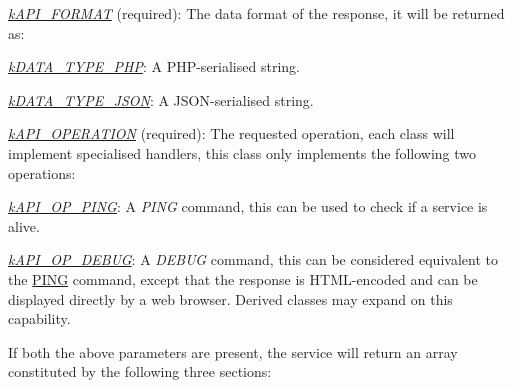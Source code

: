 \begin{DoxyItemize}
\item {\itshape \hyperlink{}{k\-A\-P\-I\-\_\-\-F\-O\-R\-M\-A\-T}\/} (required)\-: The data format of the response, it will be returned as\-: 
\begin{DoxyItemize}
\item {\itshape \hyperlink{}{k\-D\-A\-T\-A\-\_\-\-T\-Y\-P\-E\-\_\-\-P\-H\-P}\/}\-: A P\-H\-P-\/serialised string. 
\item {\itshape \hyperlink{}{k\-D\-A\-T\-A\-\_\-\-T\-Y\-P\-E\-\_\-\-J\-S\-O\-N}\/}\-: A J\-S\-O\-N-\/serialised string. 
\end{DoxyItemize}
\item {\itshape \hyperlink{}{k\-A\-P\-I\-\_\-\-O\-P\-E\-R\-A\-T\-I\-O\-N}\/} (required)\-: The requested operation, each class will implement specialised handlers, this class only implements the following two operations\-: 
\begin{DoxyItemize}
\item {\itshape \hyperlink{}{k\-A\-P\-I\-\_\-\-O\-P\-\_\-\-P\-I\-N\-G}\/}\-: A {\itshape P\-I\-N\-G\/} command, this can be used to check if a service is alive. 
\item {\itshape \hyperlink{}{k\-A\-P\-I\-\_\-\-O\-P\-\_\-\-D\-E\-B\-U\-G}\/}\-: A {\itshape D\-E\-B\-U\-G\/} command, this can be considered equivalent to the \hyperlink{}{P\-I\-N\-G} command, except that the response is H\-T\-M\-L-\/encoded and can be displayed directly by a web browser. Derived classes may expand on this capability. 
\end{DoxyItemize}
\end{DoxyItemize}

If both the above parameters are present, the service will return an array constituted by the following three sections\-:



